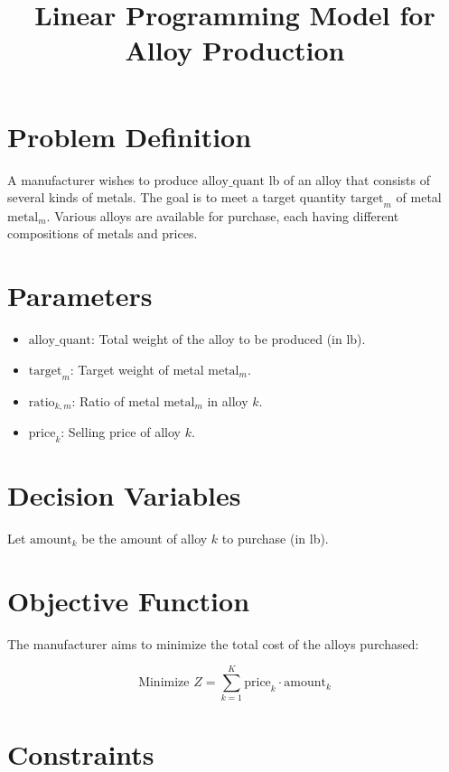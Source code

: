 \documentclass{article}
\begin{document}
\title{Linear Programming Model for Alloy Production}
\author{}
\date{}
\maketitle

\section*{Problem Definition}

A manufacturer wishes to produce \( \text{alloy\_quant} \) lb of an alloy that consists of several kinds of metals. The goal is to meet a target quantity \( \text{target}_{m} \) of metal \( \text{metal}_{m} \). Various alloys are available for purchase, each having different compositions of metals and prices.

\section*{Parameters}

\begin{itemize}
    \item \( \text{alloy\_quant} \): Total weight of the alloy to be produced (in lb).
    \item \( \text{target}_{m} \): Target weight of metal \( \text{metal}_{m} \).
    \item \( \text{ratio}_{k, m} \): Ratio of metal \( \text{metal}_{m} \) in alloy \( k \).
    \item \( \text{price}_{k} \): Selling price of alloy \( k \).
\end{itemize}

\section*{Decision Variables}

Let \( \text{amount}_{k} \) be the amount of alloy \( k \) to purchase (in lb).

\section*{Objective Function}

The manufacturer aims to minimize the total cost of the alloys purchased:

\[
\text{Minimize } Z = \sum_{k=1}^{K} \text{price}_{k} \cdot \text{amount}_{k}
\]

\section*{Constraints}
\end{document}

